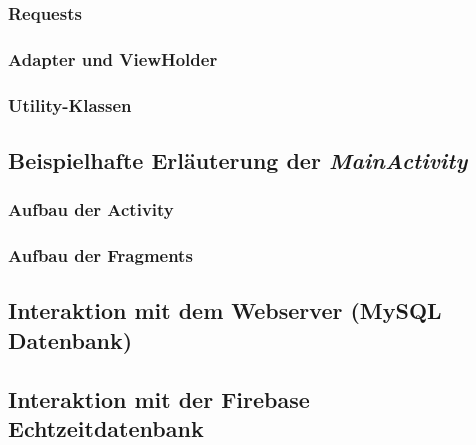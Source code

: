 \documentclass[../main.tex]{subfiles}
\begin{document}
	\subsubsection{Requests}
	\subsubsection{Adapter und ViewHolder}
	\subsubsection{Utility-Klassen}
	
	\subsection{Beispielhafte Erläuterung der \emph{MainActivity}}
	\subsubsection{Aufbau der Activity}
	\subsubsection{Aufbau der Fragments}
	
	\subsection{Interaktion mit dem Webserver (MySQL Datenbank)}
	\subsection{Interaktion mit der Firebase Echtzeitdatenbank}
	
\end{document}
